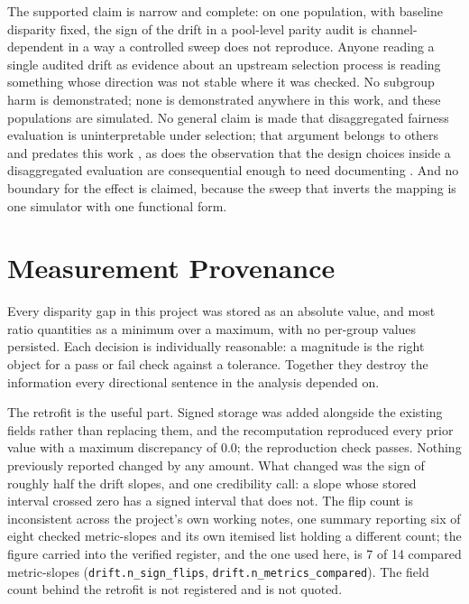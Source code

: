 The supported claim is narrow and complete: on one population, with baseline
disparity fixed, the sign of the drift in a pool-level parity audit is
channel-dependent in a way a controlled sweep does not reproduce. Anyone reading
a single audited drift as evidence about an upstream selection process is reading
something whose direction was not stable where it was checked. No subgroup harm
is demonstrated; none is demonstrated anywhere in this work, and these
populations are simulated. No general claim is made that disaggregated fairness
evaluation is uninterpretable under selection; that argument belongs to others
and predates this work \citep{pfohl2025disaggregated,fogliato2020fairness}, as
does the observation that the design choices inside a disaggregated evaluation
are consequential enough to need documenting \citep{barocas2021disaggregated}.
And no boundary for the effect is
claimed, because the sweep that inverts the mapping is one simulator with one
functional form.

\section{Measurement Provenance}
\label{sec:disc-provenance}

Every disparity gap in this project was stored as an absolute value, and most
ratio quantities as a minimum over a maximum, with no per-group values persisted.
Each decision is individually reasonable: a magnitude is the right object for a
pass or fail check against a tolerance. Together they destroy the information
every directional sentence in the analysis depended on.

The retrofit is the useful part. Signed storage was added alongside the existing
fields rather than replacing them, and the recomputation reproduced every prior
value with a maximum discrepancy of $0.0$; the reproduction check passes. Nothing
previously reported changed by any amount. What changed was the sign of roughly
half the drift slopes, and one credibility call: a slope whose stored interval
crossed zero has a signed interval that does not. The flip count is
inconsistent across the project's own working notes, one summary reporting six
of eight checked metric-slopes and its own itemised list holding a different
count; the figure carried into the verified register, and the one used here, is
7 of 14 compared metric-slopes (\texttt{drift.n\_sign\_flips},
\texttt{drift.n\_metrics\_compared}). The field count behind the retrofit is not
registered and is not quoted.

